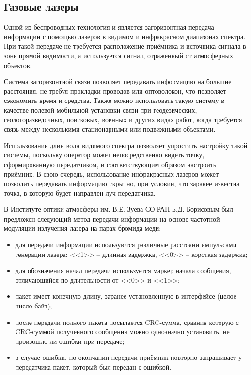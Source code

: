 \documentclass[14pt,pscyr,titlepage]{hedreport}
\begin{document}
	\subsection{Газовые лазеры}
		Одной из беспроводных технология и является загоризонтная передача 
		информации с помощью лазеров в видимом и инфракрасном диапазонах 
		спектра. При такой передаче не требуется расположение приёмника и 
		источника сигнала в зоне прямой видимости, а используется сигнал, 
		отраженный от атмосферных объектов.

		Система загоризонтной связи позволяет передавать информацию на 
		большие расстояния, не требуя прокладки проводов или оптоволокон, 
		что позволяет сэкономить время и средства. Также можно использовать 
		такую систему в качестве полевой мобильной установки связи при 
		геодезических, геологоразведочных, поисковых, военных и других 
		видах работ, когда требуется связь между несколькими стационарными 
		или подвижными объектами.

		Использование длин волн видимого спектра позволяет упростить настройку 
		такой системы, поскольку оператор может непосредственно видеть 
		точку, сформированную передатчиком, и соответствующим образом 
		настроить приёмник. В свою очередь, использование инфракрасных 
		лазеров может позволить передавать информацию скрытно, при условии, 
		что заранее известна точка, в которую будет направлен луч передатчика.

		В Институте оптики атмосферы им. В.Е. Зуева СО РАН Б.Д. Борисовым был 
		предложен следующий метод передачи информации на основе частотной 
		модуляции излучения лазера на парах бромида меди:
		\begin{itemize}\itemsep-2pt
			\item для передачи информации используются различные расстояни 
				импульсами генерации лазера: <<1>> -- длинная задержка, 
				<<0>> -- короткая задержка;
			\item для обозначения начал передачи используется маркер 
				начала сообщения, отличающийся по длительности от <<0>> и 
				<<1>>;
			\item пакет имеет конечную длину, заранее установленную в 
				интерфейсе (целое число байт);
			\item после передачи полного пакета посылается CRC-сумма, сравнив 
				которую с CRC-суммой полученного сообщения можно однозначно 
				установить, не произошло ли ошибки при передаче;
			\item в случае ошибки, по окончании передачи приёмник повторно 
				запрашивает у передатчика пакет, который был передан с ошибкой.
		\end{itemize}
\end{document}
